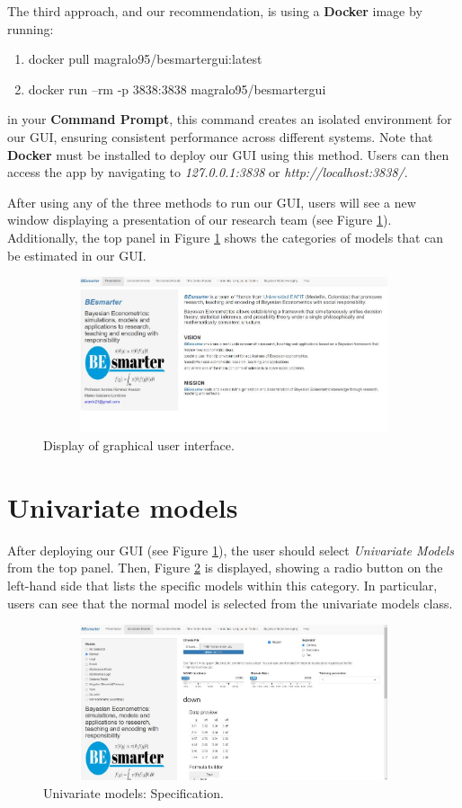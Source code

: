 The third approach, and our recommendation, is using a \textbf{Docker} image by running:
\begin{enumerate}
	\item docker pull magralo95/besmartergui:latest
	\item docker run --rm -p 3838:3838 magralo95/besmartergui  
\end{enumerate}
in your \textbf{Command Prompt}, this command creates an isolated environment for our GUI, ensuring consistent performance across different systems. Note that \textbf{Docker} must be installed to deploy our GUI using this method. Users can then access the app by navigating to \textit{127.0.0.1:3838} or \textit{http://localhost:3838/}.

After using any of the three methods to run our GUI, users will see a new window displaying a presentation of our research team (see Figure \ref{fig61}). Additionally, the top panel in Figure \ref{fig61} shows the categories of models that can be estimated in our GUI. 

\begin{figure}
	\includegraphics[width=340pt, height=130pt]{Chapters/chapterGUI/figures/Figure1.jpg}
	\caption[List of figure caption goes here]{Display of graphical user interface.}\label{fig61}
\end{figure}

\section{Univariate models}\label{secGUI2}
After deploying our GUI (see Figure \ref{fig61}), the user should select \textit{Univariate Models} from the top panel. Then, Figure \ref{fig62} is displayed, showing a radio button on the left-hand side that lists the specific models within this category. In particular, users can see that the normal model is selected from the univariate models class.

\begin{figure}
	\includegraphics[width=340pt, height=130pt]{Chapters/chapterGUI/figures/Figure2.jpg}
	\caption[List of figure caption goes here]{Univariate models: Specification.}\label{fig62}
\end{figure}

